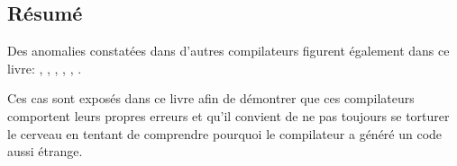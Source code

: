 \subsection{Résumé}

Des anomalies constatées dans d'autres compilateurs figurent également dans ce livre: 
, , ,
,
,
.

Ces cas sont exposés dans ce livre afin de démontrer que ces compilateurs comportent
leurs propres erreurs et qu'il convient de ne pas toujours se torturer le cerveau
en tentant de comprendre pourquoi le compilateur a généré un code aussi étrange.

